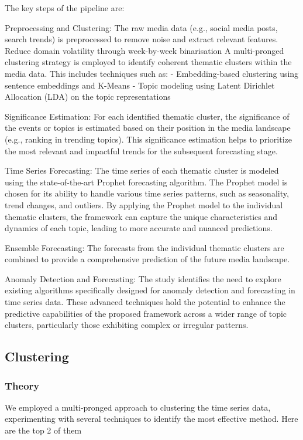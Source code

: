 The key steps of the pipeline are:

Preprocessing and Clustering:
    The raw media data (e.g., social media posts, search trends) is preprocessed to remove noise and extract relevant features.
    Reduce domain volatility through week-by-week binarisation
    A multi-pronged clustering strategy is employed to identify coherent thematic clusters within the media data. This includes techniques such as:
        - Embedding-based clustering using sentence embeddings and K-Means
        - Topic modeling using Latent Dirichlet Allocation (LDA) on the topic representations
        
Significance Estimation:
    For each identified thematic cluster, the significance of the events or topics is estimated based on their position in the media landscape (e.g., ranking in trending topics).
    This significance estimation helps to prioritize the most relevant and impactful trends for the subsequent forecasting stage.
    
Time Series Forecasting:
    The time series of each thematic cluster is modeled using the state-of-the-art Prophet forecasting algorithm.
    The Prophet model is chosen for its ability to handle various time series patterns, such as seasonality, trend changes, and outliers.
    By applying the Prophet model to the individual thematic clusters, the framework can capture the unique characteristics and dynamics of each topic, leading to more accurate and nuanced predictions.
    
Ensemble Forecasting:
    The forecasts from the individual thematic clusters are combined to provide a comprehensive prediction of the future media landscape.
    
Anomaly Detection and Forecasting:
    The study identifies the need to explore existing algorithms specifically designed for anomaly detection and forecasting in time series data.
    These advanced techniques hold the potential to enhance the predictive capabilities of the proposed framework across a wider range of topic clusters, particularly those exhibiting complex or irregular patterns.


\subsection{Clustering}

\subsubsection{Theory}
We employed a multi-pronged approach to clustering the time series data, experimenting with several techniques to identify the most effective method. Here are the top 2 of them

